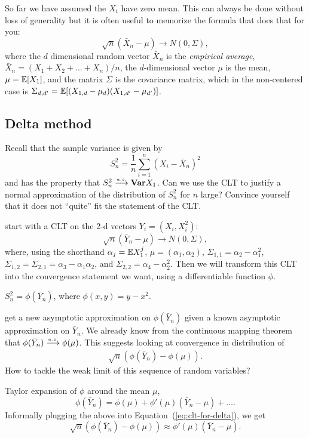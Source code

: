 \documentclass{article}
\begin{document}
So far we have assumed the $X_i$ have zero mean. This can always be done without loss of generality but it is often useful to memorize the formula that does that for you:
\[ \sqrt{n}(\bar X_n - \mu) \to N(0, \Sigma), \]
where the $d$ dimensional random vector $\bar X_n$ is the \emph{empirical average}, $\bar X_n = (X_1 + X_2 + \dots + X_n) /n$, the $d$-dimensional vector $\mu$ is the mean, $\mu = {\mathbb E}[X_1]$, and the matrix $\Sigma$ is the covariance matrix, which in the non-centered case is $\Sigma_{d,d'} = {\mathbb E}[ (X_{1,d} - \mu_d) (X_{1,d'} - \mu_{d'}) ]$.


\subsection{Delta method}

 Recall that the sample variance is given by
\[ S_n^2 = \frac{1}{n} \sum_{i=1}^n (X_i - \bar X_n)^2 \]
and has the property that $S_n^2 \stackrel{\scriptscriptstyle a.s.}{\longrightarrow} {\text {\bf Var}} X_1$. Can we use the CLT to justify a normal approximation of the distribution of $S_n^2$ for $n$ large? Convince yourself that it does not ``quite'' fit the statement of the CLT.

 start with a CLT on the 2-d vectors $Y_i = (X_i, X_i^2)$:
\[ \sqrt{n}(\bar Y_n - \mu) \to N(0, \Sigma), \]
where, using the shorthand $\alpha_j = {\mathbb E} X_1^j$, $\mu = (\alpha_1, \alpha_2)$, $\Sigma_{1,1} = \alpha_2 - \alpha_1^2$, $\Sigma_{1,2} = \Sigma_{2,1} = \alpha_3 - \alpha_1 \alpha_2$, and  $\Sigma_{2,2} = \alpha_4 - \alpha_2^2$. Then we will transform this CLT into the convergence statement we want, using a differentiable function $\phi$. 

 $S_n^2 = \phi(\bar Y_n)$, where $\phi(x, y) = y - x^2$. 

 get a new asymptotic approximation on $\phi(\bar Y_n)$ given a known asymptotic approximation on $\bar Y_n$. We already know from the continuous mapping theorem that $\phi(\bar Y_n) \stackrel{\scriptscriptstyle a.s.}{\longrightarrow} \phi(\mu)$. This suggests looking at convergence in distribution of 
\begin{align}\label{eq:clt-for-delta}
\sqrt{n}(\phi(\bar Y_n) - \phi(\mu)).
\end{align}
How to tackle the weak limit of this sequence of random variables?

 Taylor expansion of $\phi$ around the mean $\mu$, 
\[\phi(\bar Y_n) = \phi(\mu) + \phi'(\mu)(\bar Y_n - \mu) + \dots.\]
Informally plugging the above into Equation~(\ref{eq:clt-for-delta}), we get
\[ \sqrt{n}(\phi(\bar Y_n) - \phi(\mu)) \approx \phi'(\mu) (\bar Y_n - \mu). \]
\end{document}
